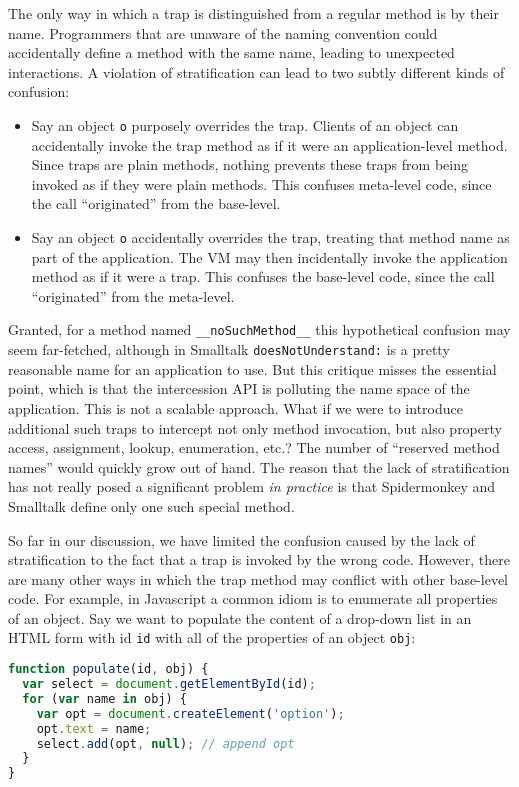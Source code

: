 \documentclass{acm_proc_article-sp}
\begin{document}
The only way in which a trap is distinguished from a regular method is by their name. Programmers that are unaware of the naming convention could accidentally define a method with the same name, leading to unexpected interactions. A violation of stratification can lead to two subtly different kinds of confusion:

\begin{itemize}
  \item Say an object \texttt{o} purposely overrides the trap. Clients of an object can accidentally invoke the trap method as if it were an application-level method. Since traps are plain methods, nothing prevents these traps from being invoked as if they were plain methods. This confuses meta-level code, since the call ``originated'' from the base-level.
  \item Say an object \texttt{o} accidentally overrides the trap, treating that method name as part of the application. The VM may then incidentally invoke the application method as if it were a trap. This confuses the base-level code, since the call ``originated'' from the meta-level.
\end{itemize}

Granted, for a method named \texttt{__noSuchMethod__} this hypothetical confusion may seem far-fetched, although in Smalltalk \texttt{doesNotUnderstand:} is a pretty reasonable name for an application to use. But this critique misses the essential point, which is that the intercession API is polluting the name space of the application. This is not a scalable approach. What if we were to introduce additional such traps to intercept not only method invocation, but also property access, assignment, lookup, enumeration, etc.? The number of ``reserved method names'' would quickly grow out of hand. The reason that the lack of stratification has not really posed a significant problem \emph{in practice} is that Spidermonkey and Smalltalk define only one such special method.

So far in our discussion, we have limited the confusion caused by the lack of stratification to the fact that a trap is invoked by the wrong code. However, there are many other ways in which the trap method may conflict with other base-level code. For example, in Javascript a common idiom is to enumerate all properties of an object. Say we want to populate the content of a drop-down list in an HTML form with id \texttt{id} with all of the properties of an object \texttt{obj}:

\begin{lstlisting}[language=javascript]
function populate(id, obj) {
  var select = document.getElementById(id);
  for (var name in obj) {
    var opt = document.createElement('option');
    opt.text = name;
    select.add(opt, null); // append opt
  }
}
\end{lstlisting}
\end{document}
